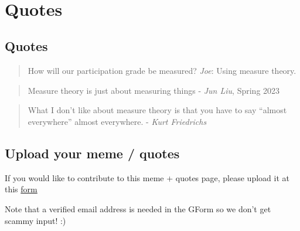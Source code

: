 \documentclass[
  letterpaper,
  DIV=11,
  numbers=noendperiod]{scrreprt}
\theoremstyle{plain}
\theoremstyle{definition}
\theoremstyle{remark}
\begin{document}
\(\,\)


\hypertarget{quotes}{%
\chapter*{Quotes}\label{quotes}}


\hypertarget{quotes-1}{%
\section*{Quotes}\label{quotes-1}}


\begin{quote}
How will our participation grade be measured? \emph{Joe}: Using measure
theory.
\end{quote}

\begin{quote}
Measure theory is just about measuring things - \emph{Jun Liu}, Spring
2023
\end{quote}

\begin{quote}
What I don't like about measure theory is that you have to say ``almost
everywhere'' almost everywhere. - \emph{Kurt Friedrichs}
\end{quote}

\hypertarget{upload-your-meme-quotes}{%
\section*{Upload your meme / quotes}\label{upload-your-meme-quotes}}


If you would like to contribute to this meme + quotes page, please
upload it at this \href{https://forms.gle/RBmMNYJp4u3qD5W79}{form}

Note that a verified email address is needed in the GForm so we don't
get scammy input! :)

\(\,\)
\end{document}
